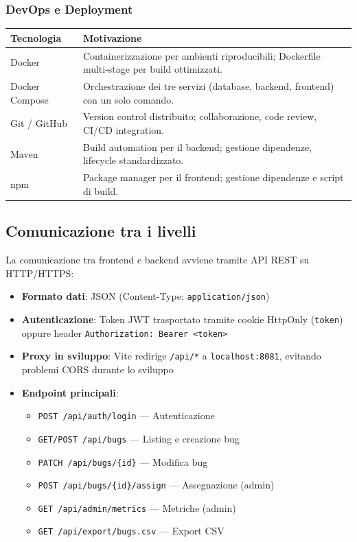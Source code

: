 \subsubsection{DevOps e Deployment}

\begin{center}
\small
\begin{tabular}{|l|p{10cm}|}
\hline
\textbf{Tecnologia} & \textbf{Motivazione} \\
\hline
Docker & Containerizzazione per ambienti riproducibili; Dockerfile multi-stage per build ottimizzati. \\
\hline
Docker Compose & Orchestrazione dei tre servizi (database, backend, frontend) con un solo comando. \\
\hline
Git / GitHub & Version control distribuito; collaborazione, code review, CI/CD integration. \\
\hline
Maven & Build automation per il backend; gestione dipendenze, lifecycle standardizzato. \\
\hline
npm & Package manager per il frontend; gestione dipendenze e script di build. \\
\hline
\end{tabular}
\end{center}

\subsection{Comunicazione tra i livelli}

La comunicazione tra frontend e backend avviene tramite API REST su HTTP/HTTPS:

\begin{itemize}
    \item \textbf{Formato dati}: JSON (Content-Type: \texttt{application/json})
    \item \textbf{Autenticazione}: Token JWT trasportato tramite cookie HttpOnly
          (\texttt{token}) oppure header \texttt{Authorization: Bearer <token>}
    \item \textbf{Proxy in sviluppo}: Vite redirige \texttt{/api/*} a
          \texttt{localhost:8081}, evitando problemi CORS durante lo sviluppo
    \item \textbf{Endpoint principali}:
    \begin{itemize}
        \item \texttt{POST /api/auth/login} — Autenticazione
        \item \texttt{GET/POST /api/bugs} — Listing e creazione bug
        \item \texttt{PATCH /api/bugs/\{id\}} — Modifica bug
        \item \texttt{POST /api/bugs/\{id\}/assign} — Assegnazione (admin)
        \item \texttt{GET /api/admin/metrics} — Metriche (admin)
        \item \texttt{GET /api/export/bugs.csv} — Export CSV
    \end{itemize}
\end{itemize}

